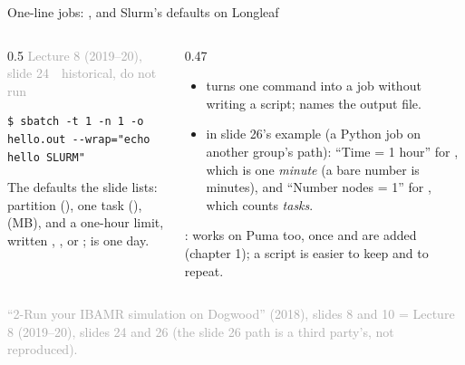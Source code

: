 \documentclass[aspectratio=169,11pt]{beamer}
\newcommand{\sourcecredit}[1]{\vfill\begin{flushright}\tiny\textcolor{DarkGray}{#1}\end{flushright}}
\newcommand{\hist}[1]{{\tiny\sffamily\textcolor{DarkGray}{#1\ \textbullet\ historical, do not run}}\par\nointerlineskip\vspace{0.3mm}}
\begin{document}
\begin{frame}[fragile]{One-line jobs: , and Slurm's defaults on Longleaf}
\label{fr:wrap}
\begin{columns}[T,onlytextwidth]
\begin{column}{0.5\textwidth}
\hist{Lecture 8 (2019--20), slide 24}
\begin{lstlisting}[style=hist]
$ sbatch -t 1 -n 1 -o hello.out --wrap="echo hello SLURM"
\end{lstlisting}
\footnotesize The defaults the slide lists: partition  (), one task (),  (MB), and a one-hour limit, written , ,  or ;  is one day.
\end{column}
\begin{column}{0.47\textwidth}
\footnotesize
\begin{itemize}\setlength{\itemsep}{2pt}
  \item {} turns one command into a job without writing a script;  names the output file.
  \item {} in slide 26's example (a Python job on another group's path): ``Time = 1 hour'' for , which is one \emph{minute} (a bare number is minutes), and ``Number nodes = 1'' for , which counts \emph{tasks}.
\end{itemize}
\vspace{1mm}
:  works on Puma too, once  and  are added (chapter 1); a script is easier to keep and to repeat.
\end{column}
\end{columns}
\sourcecredit{``2-Run your IBAMR simulation on Dogwood'' (2018), slides 8 and 10 = Lecture 8 (2019--20), slides 24 and 26 (the slide 26 path is a third party's, not reproduced).}
\end{frame}
\end{document}
